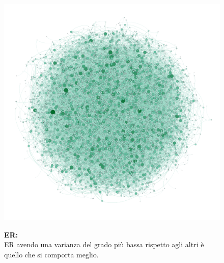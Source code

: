\documentclass{article}
\begin{document}
\begin{figure}[H]
	\begin{minipage}{0.4\linewidth}
		\centering
		\includegraphics[width=0.9\linewidth, valign=t]{figures/ER}
	\end{minipage}
	\begin{minipage}{0.55\linewidth}
		\textbf{ER:}\\
		ER avendo una varianza del grado più bassa rispetto agli altri è quello che si comporta meglio.
	\end{minipage}
\end{figure}
\end{document}
